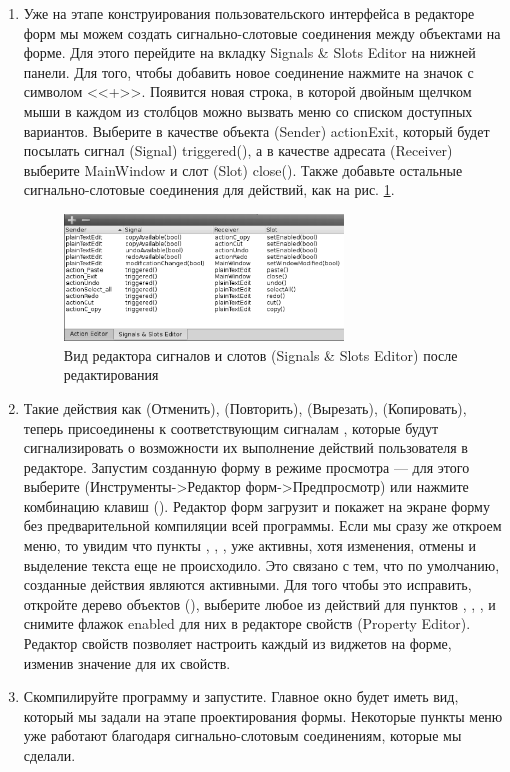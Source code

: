 \begin{enumerate}
\item Уже на этапе конструирования пользовательского интерфейса в редакторе форм мы можем создать сигнально-слотовые
соединения между объектами на форме. Для этого перейдите на вкладку Signals \& Slots Editor на нижней панели. Для того,
чтобы добавить новое соединение нажмите на значок с символом <<+>>. Появится новая строка, в которой
двойным щелчком мыши в каждом из столбцов можно вызвать меню со списком доступных вариантов. Выберите в качестве
объекта (Sender) actionExit, который будет посылать сигнал (Signal) triggered(), а в качестве адресата (Receiver)
выберите MainWindow и слот (Slot) close(). Также добавьте остальные сигнально-слотовые соединения для действий, как на
рис. \ref{ch15:refDrawing6}.

\begin{figure}[htb]
\begin{center}
\includegraphics[width=0.7\textwidth]{img/ris_15_7}
\caption[Вид редактора сигналов и слотов (Signals \& Slots Editor) после редактирования]{Вид
редактора сигналов и слотов (Signals \& Slots Editor) после редактирования}
\label{ch15:refDrawing6}
\end{center}
\end{figure}

\item Такие действия как  (Отменить),  (Повторить),  (Вырезать), 
 (Копировать), теперь присоединены к соответствующим сигналам , 
которые будут сигнализировать о возможности их выполнение действий
пользователя в редакторе. Запустим созданную форму в режиме просмотра --- для этого выберите  (Инструменты->Редактор форм->Предпросмотр) или нажмите комбинацию клавиш (). 
Редактор форм загрузит и покажет на экране
форму без предварительной компиляции всей программы. Если мы сразу же откроем меню, 
то увидим что пункты , , ,  уже активны, хотя изменения, отмены и выделение текста еще не происходило. 
Это связано с тем, что по умолчанию, созданные действия являются активными. Для того чтобы это исправить, откройте дерево объектов (), выберите любое из действий для пунктов , , ,  и 
снимите флажок enabled для них в редакторе свойств (Property Editor). Редактор свойств позволяет настроить каждый из виджетов на форме, изменив значение для их свойств. 
\item Скомпилируйте программу и запустите. Главное окно будет иметь вид, который мы задали на этапе проектирования
формы. Некоторые пункты меню уже работают благодаря сигнально-слотовым соединениям, которые мы сделали.
\end{enumerate}

